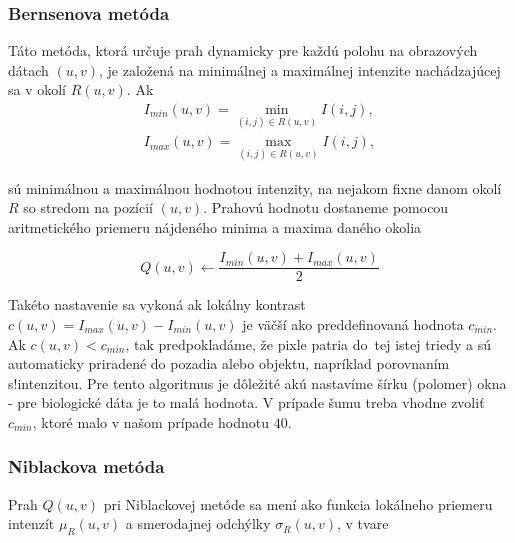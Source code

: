 \documentclass[a4paper,11pt,oneside]{article}%
\begin{document}
\subsubsection{Bernsenova metóda} \label{bernsenM}

Táto metóda, ktorá určuje prah dynamicky pre každú polohu na obrazových dátach $(u,v)$, je založená na minimálnej a maximálnej intenzite nachádzajúcej sa v okolí $R(u,v)$. Ak 
\begin{equation}
\begin{array}{l}
I_{min}(u,v) = \min\limits_{(i,j)\in R(u,v)} I(i,j),  \\
I_{max}(u,v) = \max\limits_{(i,j)\in R(u,v)} I(i,j),
\end{array}
\end{equation}

sú minimálnou a maximálnou hodnotou intenzity, na nejakom fixne danom okolí $R$ so stredom na pozícií $(u,v)$. Prahovú hodnotu dostaneme pomocou aritmetického priemeru nájdeného minima a maxima daného okolia 

\begin{equation}
Q(u,v) \gets \frac{I_{min}(u,v) + I_{max}(u,v)}{2}
\end{equation}


Takéto nastavenie sa vykoná ak lokálny kontrast $c(u, v) = I_{max}(u, v) − I_{min}(u, v)$  je väčší ako preddefinovaná hodnota $c_{min}$. Ak $c(u, v) < c_{min}$, tak predpokladáme, že pixle patria do~tej istej triedy a sú automaticky priradené do pozadia alebo objektu, napríklad porovnaním s!intenzitou.  Pre tento algoritmus je dôležité akú nastavíme šírku (polomer) okna - pre biologické dáta je to malá hodnota. V prípade šumu treba vhodne zvoliť  $c_{min}$, ktoré malo v našom prípade hodnotu $40$.

\subsubsection{Niblackova metóda} \label{niblack} 

Prah $Q(u, v)$ pri Niblackovej metóde sa mení ako funkcia lokálneho priemeru intenzít $\mu_R(u,v)$ a smerodajnej odchýlky $\sigma_R(u,v)$, v tvare
\end{document}
